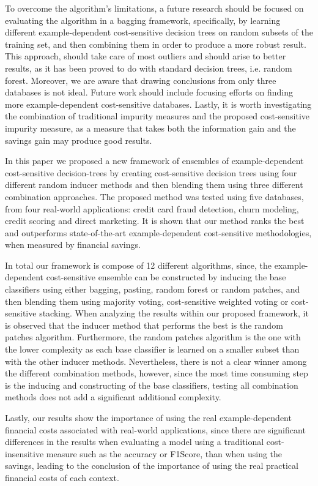 To overcome the algorithm's limitations, a future research should be focused on evaluating the 
algorithm in a bagging framework, specifically, by learning different example-dependent 
cost-sensitive decision trees on random subsets of the training set, and then combining them in 
order to produce a more robust result. This approach, should take care of most outliers and should 
arise to better results, as it has been proved to do with standard decision trees, i.e. random 
forest. Moreover, we are aware that drawing conclusions from only three databases is not ideal. 
Future work should include focusing efforts on finding more example-dependent cost-sensitive 
databases. Lastly, it is worth investigating the combination of traditional impurity measures and 
the proposed cost-sensitive impurity measure, as a measure that takes both the information gain and 
the savings gain may produce good results.

  In this paper we proposed a new framework of ensembles of example-dependent cost-sensitive 
  decision-trees by creating cost-sensitive decision trees using four different 
  random inducer methods and then blending them using three different combination approaches.
  The proposed method was tested using five databases, from four real-world applications: credit 
  card fraud detection, churn modeling, credit scoring and direct marketing. It is shown that our 
  method ranks the best and outperforms state-of-the-art example-dependent cost-sensitive 
  methodologies, when measured by financial savings.
  
  In total our framework is compose of 12 different algorithms, since, the example-dependent 
  cost-sensitive ensemble can be constructed by inducing the base classifiers using either 
  bagging, pasting, random forest or random patches, and then blending them using majority voting, 
  cost-sensitive weighted voting or cost-sensitive stacking. When analyzing the results within our 
  proposed framework, it is observed that the inducer method that performs the best is the random 
  patches algorithm. Furthermore, the random patches algorithm is the one with the 
  lower complexity as each base classifier is learned on a smaller subset than with the 
  other inducer methods. Nevertheless, there is not a clear winner among the different combination  
  methods, however, since the most time consuming step is the inducing and constructing of the 
  base classifiers, testing all combination methods does not add a significant additional  
  complexity.
  
  Lastly, our results show the importance of using the real example-dependent financial costs 
  associated with real-world applications, since there are significant differences in the 
  results when evaluating a model using a traditional cost-insensitive measure such as the 
  accuracy or F1Score,  than when using the savings, leading to the conclusion of the 
  importance of using the real practical financial costs of each context.
